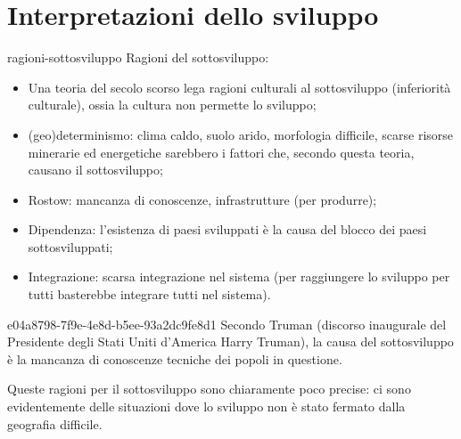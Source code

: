\documentclass[preview]{standalone}
\begin{document}
\genpage

\section{Interpretazioni dello sviluppo}


\begin{snippet}{ragioni-sottosviluppo}
    Ragioni del sottosviluppo:
    \begin{itemize}
        \item Una teoria del secolo scorso lega ragioni culturali al sottosviluppo (inferiorità culturale),
            ossia la cultura non permette lo sviluppo;
        \item (geo)determinismo: clima caldo, suolo arido, morfologia difficile,
            scarse risorse minerarie ed energetiche sarebbero i fattori che, secondo questa teoria, causano il sottosviluppo;
        \item Rostow: mancanza di conoscenze, infrastrutture (per produrre);
        \item Dipendenza: l'esistenza di paesi sviluppati è la causa del blocco dei paesi sottosviluppati;
        \item Integrazione: scarsa integrazione nel sistema (per raggiungere lo sviluppo per tutti basterebbe integrare tutti nel sistema).
    \end{itemize}
\end{snippet}

\begin{snippet}{e04a8798-7f9e-4e8d-b5ee-93a2dc9fe8d1}
    Secondo Truman (discorso inaugurale del Presidente degli Stati Uniti d'America Harry Truman),
    la causa del sottosviluppo è la mancanza di conoscenze tecniche dei popoli in questione.
    
    Queste ragioni per il sottosviluppo sono chiaramente poco precise: ci sono
    evidentemente delle situazioni dove lo sviluppo non è stato fermato dalla geografia difficile.
\end{snippet}


\end{document}
